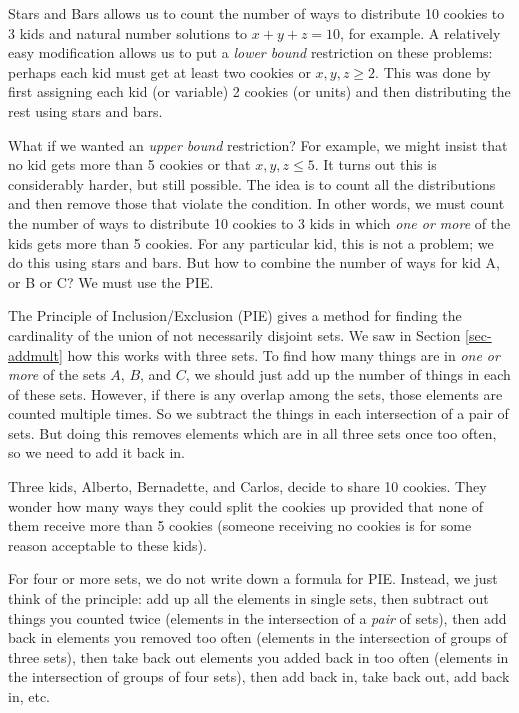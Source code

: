 \documentclass[12pt]{article}
\begin{document}
Stars and Bars allows us to count the number of ways to distribute 10 cookies to 3 kids and natural number solutions to $x+y+z = 10$, for example.  A relatively easy modification allows us to put a \emph{lower bound} restriction on these problems: perhaps each kid must get at least two cookies or $x,y,z \ge 2$.  This was done by first assigning each kid (or variable) 2 cookies (or units) and then distributing the rest using stars and bars.

What if we wanted an \emph{upper bound} restriction?  For example, we might insist that no kid gets more than 5 cookies or that $x, y, z \le 5$.  It turns out this is considerably harder, but still possible.  The idea is to count all the distributions and then remove those that violate the condition.  In other words, we must count the number of ways to distribute 10 cookies to 3 kids in which \emph{one or more} of the kids gets more than 5 cookies.  For any particular kid, this is not a problem; we do this using stars and bars.  But how to combine the number of ways for kid A, or B or C?  We must use the PIE.  


The Principle of Inclusion/Exclusion (PIE) gives a method for finding the cardinality of the union of not necessarily disjoint sets.  We saw in Section \ref{sec-addmult} how this works with three sets.  To find how many things are in {\em one or more} of the sets $A$, $B$, and $C$, we should just add up the number of things in each of these sets.  However, if there is any overlap among the sets, those elements are counted multiple times.  So we subtract the things in each intersection of a pair of sets.  But doing this removes elements which are in all three sets once too often, so we need to add it back in.

\begin{example}
Three kids, Alberto, Bernadette, and Carlos, decide to share 10 cookies.  They wonder how many ways they could split the cookies up provided that none of them receive more than 5 cookies (someone receiving no cookies is for some reason acceptable to these kids).
\end{example}


For four or more sets, we do not write down a formula for PIE.  Instead, we just think of the principle: add up all the elements in single sets, then subtract out things you counted twice (elements in the intersection of a {\em pair} of sets), then add back in elements you removed too often (elements in the intersection of groups of three sets), then take back out elements you added back in too often (elements in the intersection of groups of four sets), then add back in, take back out, add back in, etc.  
\end{document}
